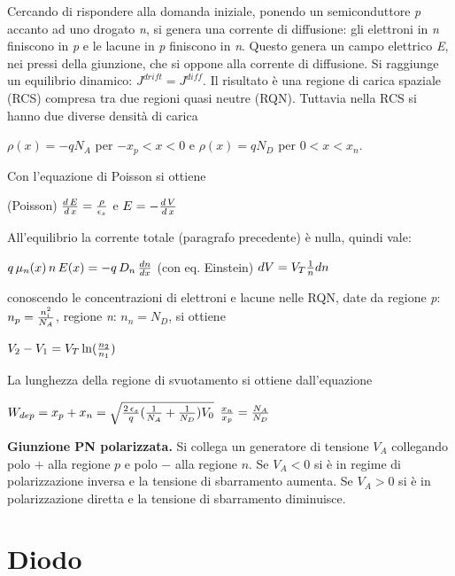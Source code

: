 \documentclass[a4paper,portrait,12pt]{article}
\theoremstyle{definition}
\begin{document}
Cercando di rispondere alla domanda iniziale, ponendo un semiconduttore \textit{p} accanto ad uno drogato 
\textit{n}, si genera una 
corrente di diffusione: gli elettroni in \textit{n} finiscono in \textit{p} e le lacune in \textit{p} 
finiscono in \textit{n}. Questo genera un campo elettrico \textit{E}, nei pressi della giunzione, che si 
oppone alla corrente di diffusione. Si raggiunge un equilibrio dinamico: $J^{drift} = J^{diff}$.
Il risultato è una regione di carica spaziale (RCS) compresa tra due regioni quasi neutre (RQN). Tuttavia 
nella RCS si hanno due diverse densità di carica
\begin{center}
$\rho(x) = -qN_A$ per $-x_p<x<0$ \quad e \quad $\rho(x) = qN_D$ per $0<x<x_n$.
\end{center}
Con l'equazione di Poisson si ottiene
\begin{center}
(Poisson) ${d\,E \over d\,x} = {\rho \over \epsilon_s}$ \quad e \quad $E = -{d\,V \over d\,x}$
\end{center}
All'equilibrio la corrente totale (paragrafo precedente) è nulla, quindi vale:
\begin{center}
$q\,\mu_n(x)\,n\,E(x) = -q\,D_n\,{dn \over dx}$ \quad (con eq. Einstein) \quad $dV = V_T{1 \over n}dn$
\end{center}
conoscendo le concentrazioni di elettroni e lacune nelle RQN, date da
regione \textit{p}: $n_p = {n_i^2 \over N_A}$, regione \textit{n}: $n_n = N_D$, si ottiene
\begin{center}
$V_2 - V_1 = V_T \ln({n_2 \over n_1})$
\end{center}
La lunghezza della regione di svuotamento si ottiene dall'equazione
\begin{center}
$W_{dep} = x_p + x_n = \sqrt{{2\,\epsilon_s \over q}({1\over N_A} + {1\over N_D})V_0}$ \quad ${x_n \over 
x_p} = {N_A \over N_D}$
\end{center}

\textbf{Giunzione PN polarizzata.} Si collega un generatore di tensione $V_A$ collegando polo $+$ alla 
regione $p$ e polo $-$ alla regione $n$. Se $V_A < 0$ si è in regime di polarizzazione inversa e la 
tensione  di sbarramento aumenta. Se $V_A > 0$ si è in polarizzazione diretta e la tensione di 
sbarramento diminuisce.


\section{Diodo}
\end{document}
